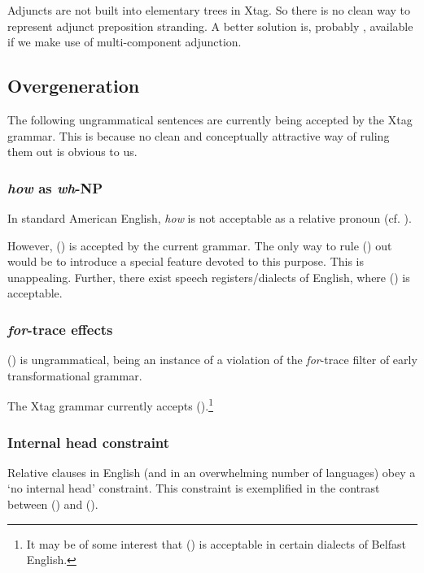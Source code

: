 
Adjuncts are not built into elementary trees in Xtag. So there is no
clean way to represent adjunct preposition stranding. A better
solution is, probably , available if we make use of multi-component
adjunction. 

\subsection{Overgeneration}
The following ungrammatical sentences are currently being 
accepted by the Xtag grammar. This is because no clean 
and conceptually attractive way of ruling them out
is obvious to us.

\subsubsection{{\em how} as {\em wh}-NP}
In standard American English, {\em how} is not acceptable as a 
relative pronoun (cf. ).


However, () is accepted by the current grammar.
The only way to rule () out would be to introduce a special feature
devoted to this purpose. This is unappealing. Further, there exist
speech registers/dialects of English, where () is acceptable. 

\subsubsection{{\em for}-trace effects}
() is ungrammatical, being an instance of a violation of the
{\em for}-trace filter of early transformational grammar.


The Xtag grammar currently accepts ().\footnote{It may be of
some interest that () is acceptable in certain dialects of Belfast
English.}


\subsubsection{Internal head constraint}
Relative clauses in English (and in an overwhelming number of languages)
obey a `no internal head' constraint. This constraint is exemplified in
the contrast between () and ().

